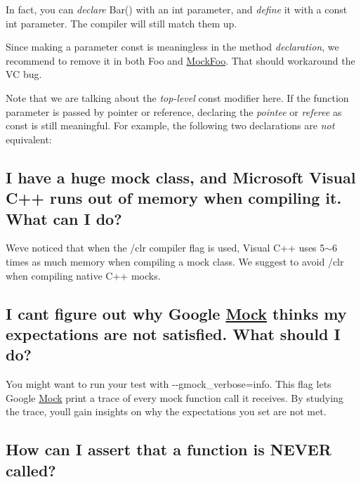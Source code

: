 In fact, you can {\itshape declare} Bar() with an {\ttfamily int} parameter, and {\itshape define} it with a {\ttfamily const int} parameter. The compiler will still match them up.

Since making a parameter {\ttfamily const} is meaningless in the method {\itshape declaration}, we recommend to remove it in both {\ttfamily Foo} and {\ttfamily \mbox{\hyperlink{class_mock_foo}{Mock\+Foo}}}. That should workaround the VC bug.

Note that we are talking about the {\itshape top-\/level} {\ttfamily const} modifier here. If the function parameter is passed by pointer or reference, declaring the {\itshape pointee} or {\itshape referee} as {\ttfamily const} is still meaningful. For example, the following two declarations are {\itshape not} equivalent\+: 
\begin{DoxyCode}{0}
\end{DoxyCode}


\subsection*{I have a huge mock class, and Microsoft Visual C++ runs out of memory when compiling it. What can I do?}

We\textquotesingle{}ve noticed that when the {\ttfamily /clr} compiler flag is used, Visual C++ uses 5$\sim$6 times as much memory when compiling a mock class. We suggest to avoid {\ttfamily /clr} when compiling native C++ mocks.

\subsection*{I can\textquotesingle{}t figure out why Google \mbox{\hyperlink{class_mock}{Mock}} thinks my expectations are not satisfied. What should I do?}

You might want to run your test with {\ttfamily -\/-\/gmock\+\_\+verbose=info}. This flag lets Google \mbox{\hyperlink{class_mock}{Mock}} print a trace of every mock function call it receives. By studying the trace, you\textquotesingle{}ll gain insights on why the expectations you set are not met.

\subsection*{How can I assert that a function is N\+E\+V\+ER called?}


